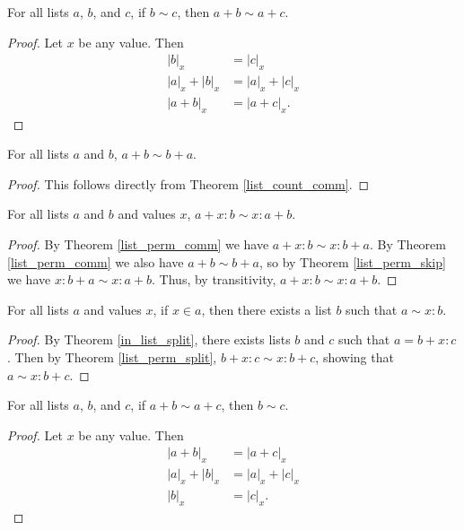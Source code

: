 \documentclass[../math.tex]{subfiles}
\begin{document}
\begin{theorem} \label{list_perm_rpart}
    For all lists $a$, $b$, and $c$, if $b \sim c$, then $a + b \sim a + c$.
\end{theorem}
\begin{proof}
    Let $x$ be any value.  Then
    \begin{align*}
        |b|_x &= |c|_x \\
        |a|_x + |b|_x &= |a|_x + |c|_x \\
        |a + b|_x &= |a + c|_x.
    \end{align*}
\end{proof}

\begin{theorem} \label{list_perm_comm}
    For all lists $a$ and $b$, $a + b \sim b + a$.
\end{theorem}
\begin{proof}
    This follows directly from Theorem \ref{list_count_comm}.
\end{proof}

\begin{theorem} \label{list_perm_split}
    For all lists $a$ and $b$ and values $x$, $a + x : b \sim x : a + b$.
\end{theorem}
\begin{proof}
    By Theorem \ref{list_perm_comm} we have $a + x : b \sim x : b + a$.  By
    Theorem \ref{list_perm_comm} we also have $a + b \sim b + a$, so by Theorem
    \ref{list_perm_skip} we have $x : b + a \sim x : a + b$.  Thus, by
    transitivity, $a + x : b \sim x : a + b$.
\end{proof}

\begin{theorem} \label{list_split_perm}
    For all lists $a$ and values $x$, if $x \in a$, then there exists a list $b$
    such that $a \sim x : b$.
\end{theorem}
\begin{proof}
    By Theorem \ref{in_list_split}, there exists lists $b$ and $c$ such that $a
    = b + x : c$.  Then by Theorem \ref{list_perm_split}, $b + x : c \sim x : b
    + c$, showing that $a \sim x : b + c$.
\end{proof}

\begin{theorem} \label{list_perm_conc_lcancel}
    For all lists $a$, $b$, and $c$, if $a + b \sim a + c$, then $b \sim c$.
\end{theorem}
\begin{proof}
    Let $x$ be any value.  Then
    \begin{align*}
        |a + b|_x &= |a + c|_x \\
        |a|_x + |b|_x &= |a|_x + |c|_x \\
        |b|_x &= |c|_x.
    \end{align*}
\end{proof}
\end{document}
